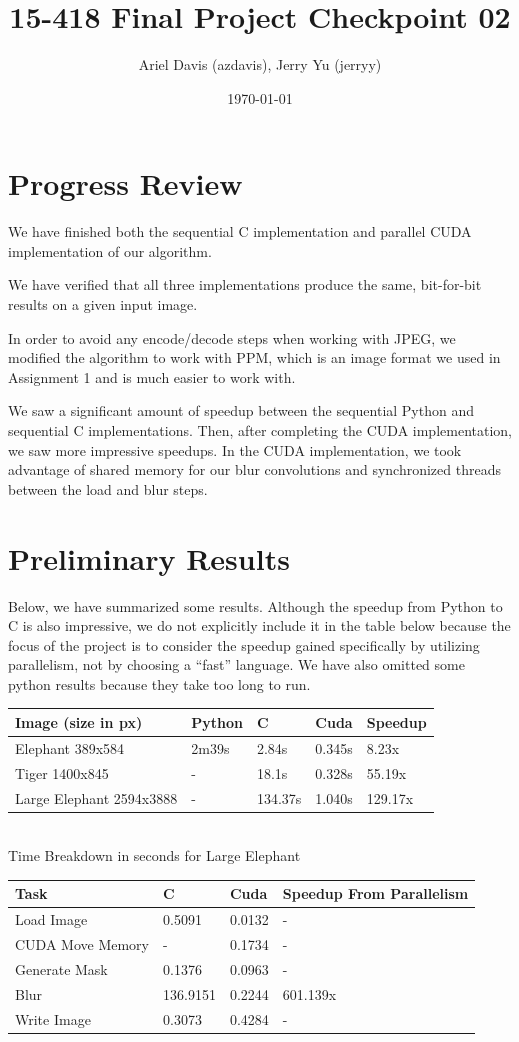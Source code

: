 \documentclass[12pt]{article}
\author{Ariel Davis (azdavis), Jerry Yu (jerryy)}
\date{\today}
\title{15-418 Final Project Checkpoint 02}
\begin{document}
\maketitle

\section{Progress Review}

We have finished both the sequential C implementation and parallel CUDA
implementation of our algorithm.

We have verified that all three implementations produce the same, bit-for-bit
results on a given input image.

In order to avoid any encode/decode steps when working with JPEG, we modified
the algorithm to work with PPM, which is an image format we used in Assignment
1 and is much easier to work with.

We saw a significant amount of speedup between the sequential Python and
sequential C implementations. Then, after completing the CUDA implementation,
we saw more impressive speedups. In the CUDA implementation, we took advantage
of shared memory for our blur convolutions and synchronized threads between
the load and blur steps.

\section{Preliminary Results}

Below, we have summarized some results. Although the speedup from Python to C
is also impressive, we do not explicitly include it in the table below because
the focus of the project is to consider the speedup gained specifically by
utilizing parallelism, not by choosing a ``fast'' language. We have also
omitted some python results because they take too long to run.

\begin{tabular}{l|l|l|l|l}
    Image (size in px) & Python & C & Cuda & Speedup \\
    \hline
    Elephant 389x584 & 2m39s & 2.84s & 0.345s & 8.23x \\
    Tiger 1400x845 & - & 18.1s & 0.328s & 55.19x \\
    Large Elephant 2594x3888 & - & 134.37s & 1.040s & 129.17x \\
\end{tabular}
\\
Time Breakdown in seconds for Large Elephant \\
\begin{tabular}{l|l|l|l}
    Task & C & Cuda & Speedup From Parallelism\\
    \hline
    Load Image & 0.5091 & 0.0132 & - \\
    CUDA Move Memory & - & 0.1734 & - \\
    Generate Mask & 0.1376 & 0.0963 & - \\
    Blur & 136.9151 & 0.2244 & 601.139x \\
    Write Image & 0.3073 & 0.4284 & -
\end{tabular}
\end{document}
